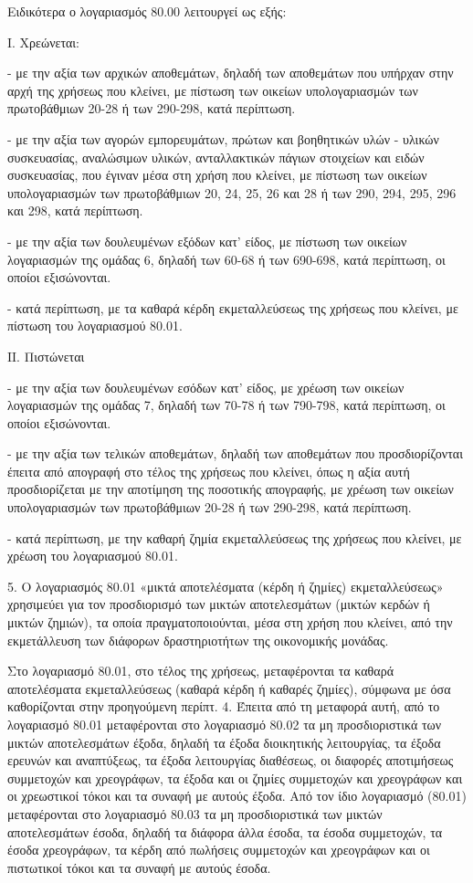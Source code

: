 \documentclass[A4,10pt,greek]{book}
\begin{document}
Ειδικότερα ο λογαριασμός 80.00 λειτουργεί ως εξής:

Ι. Χρεώνεται:

- με την αξία των αρχικών αποθεμάτων, δηλαδή των αποθεμάτων που υπήρχαν στην αρχή της χρήσεως που κλείνει, με πίστωση των οικείων υπολογαριασμών των πρωτοβάθμιων 20-28 ή των 290-298, κατά περίπτωση.

- με την αξία των αγορών εμπορευμάτων, πρώτων και βοηθητικών υλών - υλικών συσκευασίας, αναλώσιμων υλικών, ανταλλακτικών πάγιων στοιχείων και ειδών συσκευασίας, που έγιναν μέσα στη χρήση που κλείνει, με πίστωση των οικείων υπολογαριασμών των πρωτοβάθμιων 20, 24, 25, 26 και 28 ή των 290, 294, 295, 296 και 298, κατά περίπτωση.

- με την αξία των δουλευμένων εξόδων κατ' είδος, με πίστωση των οικείων λογαριασμών της ομάδας 6, δηλαδή των 60-68 ή των 690-698, κατά περίπτωση, οι οποίοι εξισώνονται.

- κατά περίπτωση, με τα καθαρά κέρδη εκμεταλλεύσεως της χρήσεως που κλείνει, με πίστωση του λογαριασμού 80.01.

ΙΙ. Πιστώνεται

- με την αξία των δουλευμένων εσόδων κατ' είδος, με χρέωση των οικείων λογαριασμών της ομάδας 7, δηλαδή των 70-78 ή των 790-798, κατά περίπτωση, οι οποίοι εξισώνονται.

- με την αξία των τελικών αποθεμάτων, δηλαδή των αποθεμάτων που προσδιορίζονται έπειτα από απογραφή στο τέλος της χρήσεως που κλείνει, όπως η αξία αυτή προσδιορίζεται με την αποτίμηση της ποσοτικής απογραφής, με χρέωση των οικείων υπολογαριασμών των πρωτοβάθμιων 20-28 ή των 290-298, κατά περίπτωση.

- κατά περίπτωση, με την καθαρή ζημία εκμεταλλεύσεως της χρήσεως που κλείνει, με χρέωση του λογαριασμού 80.01.

5. Ο λογαριασμός 80.01 «μικτά αποτελέσματα (κέρδη ή ζημίες) εκμεταλλεύσεως» χρησιμεύει για τον προσδιορισμό των μικτών αποτελεσμάτων (μικτών κερδών ή μικτών ζημιών), τα οποία πραγματοποιούνται, μέσα στη χρήση που κλείνει, από την εκμετάλλευση των διάφορων δραστηριοτήτων της οικονομικής μονάδας.

Στο λογαριασμό 80.01, στο τέλος της χρήσεως, μεταφέρονται τα καθαρά αποτελέσματα εκμεταλλεύσεως (καθαρά κέρδη ή καθαρές ζημίες), σύμφωνα με όσα καθορίζονται στην προηγούμενη περίπτ. 4. Έπειτα από τη μεταφορά αυτή, από το λογαριασμό 80.01 μεταφέρονται στο λογαριασμό 80.02 τα μη προσδιοριστικά των μικτών αποτελεσμάτων έξοδα, δηλαδή τα έξοδα διοικητικής λειτουργίας, τα έξοδα ερευνών και αναπτύξεως, τα έξοδα λειτουργίας διαθέσεως, οι διαφορές αποτιμήσεως συμμετοχών και χρεογράφων, τα έξοδα και οι ζημίες συμμετοχών και χρεογράφων και οι χρεωστικοί τόκοι και τα συναφή με αυτούς έξοδα. Από τον ίδιο λογαριασμό (80.01) μεταφέρονται στο λογαριασμό 80.03 τα μη προσδιοριστικά των μικτών αποτελεσμάτων έσοδα, δηλαδή τα διάφορα άλλα έσοδα, τα έσοδα συμμετοχών, τα έσοδα χρεογράφων, τα κέρδη από πωλήσεις συμμετοχών και χρεογράφων και οι πιστωτικοί τόκοι και τα συναφή με αυτούς έσοδα.
\end{document}
